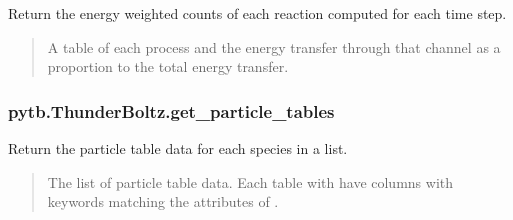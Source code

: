 \documentclass[letterpaper,10pt,english,openany,oneside]{sphinxmanual}
\begin{document}
\begin{fulllineitems}
\begin{fulllineitems}
\label{\detokenize{api/pytb.ThunderBoltz.get_etrans:pytb.ThunderBoltz.get_etrans}}
\pysigstartsignatures
{}
\pysigstopsignatures
\sphinxAtStartPar
Return the energy weighted counts of each reaction computed
for each time step.
\begin{quote}\begin{description}
\sphinxAtStartPar
A table of each process and the
energy transfer through that channel as a proportion
to the total energy transfer.

\sphinxAtStartPar
{}

\end{description}\end{quote}

\end{fulllineitems}


\sphinxstepscope


\subsubsection{pytb.ThunderBoltz.get\_particle\_tables}
\label{\detokenize{api/pytb.ThunderBoltz.get_particle_tables:pytb-thunderboltz-get-particle-tables}}\label{\detokenize{api/pytb.ThunderBoltz.get_particle_tables::doc}}

\begin{fulllineitems}
\label{\detokenize{api/pytb.ThunderBoltz.get_particle_tables:pytb.ThunderBoltz.get_particle_tables}}
\pysigstartsignatures
{}
\pysigstopsignatures
\sphinxAtStartPar
Return the particle table data for each species
in a list.
\begin{quote}\begin{description}
\sphinxAtStartPar
The list of particle
table data. Each table with have columns with keywords
matching the attributes of
{\hyperref[\detokenize{api/pytb.parameters.ParticleParameters:pytb.parameters.ParticleParameters}]{}}.


\end{description}
\end{quote}
\end{fulllineitems}
\end{fulllineitems}
\end{document}
